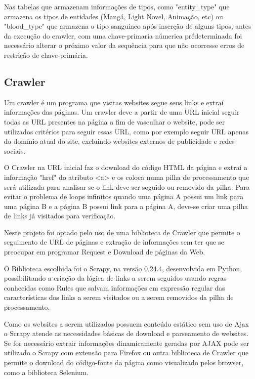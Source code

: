 \documentclass[12pt]{article}
\begin{document}
Nas tabelas que armazenam informações de tipos, como "entity\_type" que armazena os tipos de entidades (Mangá, Light Novel, Animação, etc) ou "blood\_type" que armazena o tipo sanguíneo após inserção de alguns tipos, antes da execução do crawler, com uma chave-primaria númerica prédeterminada foi necessário alterar o próximo valor da sequência para que não ocorresse erros de restrição de chave-primária.  


\subsection{Crawler}

Um crawler é um programa que visitas websites segue seus links e extraí informações das páginas. Um crawler deve a partir de uma URL inicial seguir todas as URL presentes na página a fim de vasculhar o website, 
pode ser utilizados critérios para seguir essas URL, como por exemplo seguir URL apenas do domínio atual do site, excluindo websites externos de publicidade e redes sociais.

O Crawler na URL inicial faz o download do código HTML da página e extraí a informação "href" do atributo <a> e os coloca numa pilha de processamento que será utilizada para analisar se o link deve ser seguido ou removido da pilha. 
Para evitar o problema de loops infinitos quando uma página A possui um link para uma página B e a página B possui link para a página A, deve-se criar uma pilha de links já visitados para verificação.   
 
Neste projeto foi optado pelo uso de uma biblioteca de Crawler que permite o seguimento de URL de páginas e extração de informações sem ter que se preocupar em programar Request e Download de páginas da Web.

O Biblioteca escolhida foi o Scrapy, na versão 0.24.4, desenvolvida em Python, possibilitando a criação da lógica de links a serem seguidos usando regras conhecidas como Rules que salvam informações em expressão regular das características dos links a serem visitados ou a serem removidos da pilha de processamento.
 
Como os websites a serem utilizados possuem conteúdo estático sem uso de Ajax o Scrapy atende as necessidades básicas de download e parseamento de websites. Se for necessário extrair informações dinamicamente geradas por AJAX pode ser utilizado o Scrapy com extensão para Firefox ou outra biblioteca de Crawler que permite o download do código-fonte da página como visualizado pelos browser, como a biblioteca Selenium.
\end{document}
